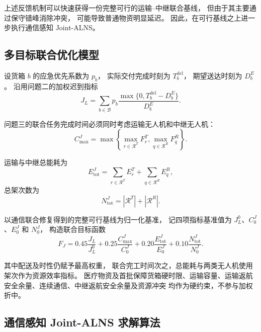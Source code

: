 上述反馈机制可以快速获得一份完整可行的运输--中继联合基线，
但由于其主要通过保守错峰消除冲突，
可能导致普通物资明显延迟。
因此，在可行基线之上进一步执行通信感知 Joint-ALNS。

\subsection{多目标联合优化模型}

设货箱 $b$ 的应急优先系数为 $p_b$，
实际交付完成时刻为 $T_b^{\mathrm{del}}$，
期望送达时刻为 $D_b^E$。
沿用问题二的加权迟到指标
\begin{equation}
J_L
=\sum_{b\in\mathcal B}
p_b
\frac{\max\{0,T_b^{\mathrm{del}}-D_b^E\}}
{D_b^E}.
\label{eq:q3-lateness}
\end{equation}

问题三的联合任务完成时间必须同时考虑运输无人机和中继无人机：
\begin{equation}
C_{\max}^{J}
=
\max\left\{
\max_{r\in\mathcal R^T}F_r^T,
\max_{q\in\mathcal R^R}F_q^R
\right\}.
\label{eq:q3-joint-makespan}
\end{equation}

运输与中继总能耗为
\begin{equation}
E_{\mathrm{tot}}^{J}
=\sum_{r\in\mathcal R^T}E_r^T
+\sum_{q\in\mathcal R^R}E_q^R,
\label{eq:q3-joint-energy}
\end{equation}
总架次数为
\begin{equation}
N_{\mathrm{tot}}^{J}
=|\mathcal R^T|+|\mathcal R^R|.
\label{eq:q3-joint-trips}
\end{equation}

以通信联合修复得到的完整可行基线为归一化基准，
记四项指标基准值为
$J_L^0$、$C_0^J$、$E_0^J$ 和 $N_0^J$，
构造联合目标函数
\begin{equation}
F_J
=0.45\frac{J_L}{J_L^0}
+0.25\frac{C_{\max}^{J}}{C_0^J}
+0.20\frac{E_{\mathrm{tot}}^{J}}{E_0^J}
+0.10\frac{N_{\mathrm{tot}}^{J}}{N_0^J}.
\label{eq:q3-joint-objective}
\end{equation}

其中配送及时性仍赋予最高权重，
联合完工时间次之，总能耗与两类无人机使用架次作为资源效率指标。
医疗物资及首批保障货箱硬时限、运输容量、运输返航安全余量、连续通信、中继返航安全余量及资源冲突
均作为硬约束，不参与加权折中。

\subsection{通信感知 Joint-ALNS 求解算法}

